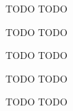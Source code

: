 \documentclass{article}
\begin{document}
\newpage
{} TODO
 \tri
\hop 
\solution
TODO


\newpage
{} TODO
 \tri
\hop 
\solution
TODO


\newpage
{} TODO
 \tri
\hop 
\solution
TODO


\newpage
{} TODO
 \tri
\hop 
\solution
TODO


\newpage
{} TODO
 \tri
\hop 
\solution
TODO
\end{document}
